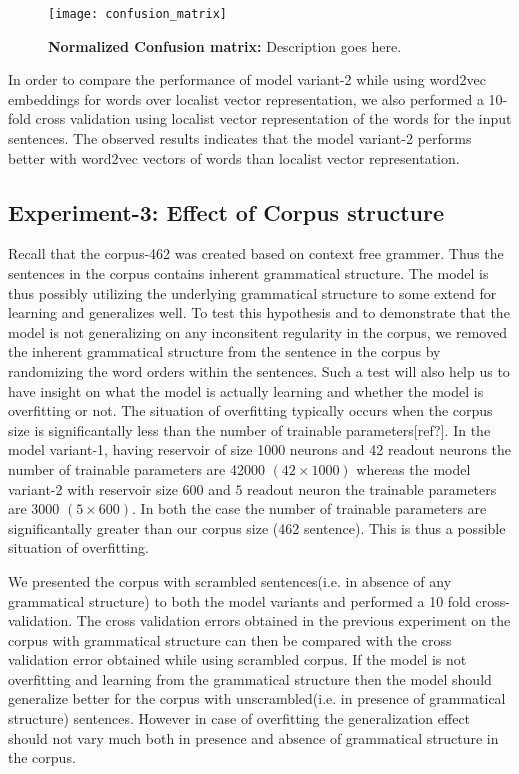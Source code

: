 \begin{figure}[hbtp]
\centering
\texttt{[image: confusion\_matrix]}
\caption{\textbf{Normalized Confusion matrix:} Description goes here.}
\label{fig:confusion_matrix}
\end{figure}

In order to compare the performance of model variant-2 while using word2vec embeddings for words over localist vector representation, we also performed a 10-fold cross validation using localist vector representation of the words for the input sentences. The observed results indicates that the model variant-2 performs better with word2vec vectors of words than localist vector representation. 

\subsection{Experiment-3: Effect of Corpus structure} 

Recall that the corpus-462 was created based on context free grammer. Thus the sentences in the corpus contains inherent grammatical structure. The model is thus possibly utilizing the underlying grammatical structure to some extend for learning and generalizes well. To test this hypothesis and to demonstrate that the model is not generalizing on any inconsitent regularity in the corpus, we removed the inherent grammatical structure from the sentence in the corpus by randomizing the word orders within the sentences. Such a test will also help us to have insight on what the model is actually learning and whether the model is overfitting or not. The situation of overfitting typically occurs when the corpus size is significantally less than the number of trainable parameters[ref?]. In the model variant-1, having reservoir of size 1000 neurons and 42 readout neurons the number of trainable parameters are 42000 $(42\times 1000)$  whereas the model variant-2 with reservoir size $600$ and $5$ readout neuron the trainable parameters are 3000 $(5 \times 600)$. In both the case the number of trainable parameters are significantally greater than our corpus size (462 sentence). This is thus a possible situation of overfitting.

We presented the corpus with scrambled sentences(i.e. in absence of any grammatical structure) to both the model variants and performed a 10 fold cross-validation. The cross validation errors obtained in the previous experiment on the corpus with grammatical structure can then be compared with the cross validation error obtained while using scrambled corpus. If the model is not overfitting and learning from the grammatical structure then the model should generalize better for the corpus with unscrambled(i.e. in presence of grammatical structure) sentences. However in case of overfitting the generalization effect should not vary much both in presence and absence of grammatical structure in the corpus.


